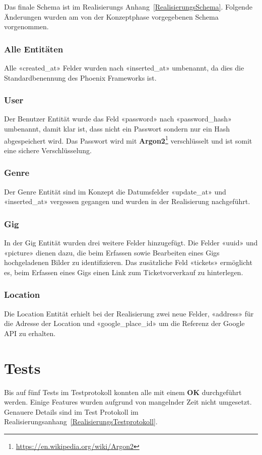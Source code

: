 Das finale Schema ist im Realisierungs Anhang~\ref{RealisierungsSchema}.
Folgende Änderungen wurden am von der Konzeptphase vorgegebenen Schema vorgenommen.

\subsubsection{Alle Entitäten}
Alle «created\_at» Felder wurden nach «inserted\_at» umbenannt, da dies die
Standardbenennung des Phoenix Frameworks ist.

\subsubsection{User}
Der Benutzer Entität wurde das Feld «password» nach «password\_hash» umbenannt,
damit klar ist, dass nicht ein Passwort sondern nur ein Hash abgespeichert wird.
Das Passwort wird mit \textbf{Argon2}\footnote{\url{https://en.wikipedia.org/wiki/Argon2}}
verschlüsselt und ist somit eine sichere Verschlüsselung.

\subsubsection{Genre}
Der Genre Entität sind im Konzept die Datumsfelder «update\_at» und «inserted\_at»
vergessen gegangen und wurden in der Realisierung nachgeführt.

\subsubsection{Gig}\label{RealisierungSchemaGig}
In der Gig Entität wurden drei weitere Felder hinzugefügt.
Die Felder «uuid» und «picture» dienen dazu, die beim Erfassen sowie
Bearbeiten eines Gigs hochgeladenen Bilder zu identifizieren.
Das zusätzliche Feld «tickets» ermöglicht es, beim Erfassen eines Gigs
einen Link zum Ticketvorverkauf zu hinterlegen.

\subsubsection{Location}
Die Location Entität erhielt bei der Realisierung zwei neue Felder,
«address» für die Adresse der Location und
«google\_place\_id» um die Referenz der Google API zu erhalten.

\section{Tests}

Bis auf fünf Tests im Testprotokoll konnten alle mit einem \textbf{OK}
durchgeführt werden. Einige Features wurden aufgrund von mangelnder Zeit nicht
umgesetzt. Genauere Details sind im Test Protokoll im
Realisierungsanhang~\ref{RealisierungsTestprotokoll}.
